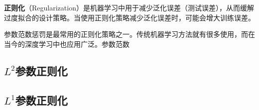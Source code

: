 
\textbf{正则化}（Regularization）是机器学习中用于减少泛化误差（测试误差），从而缓解过度拟合的设计策略。当使用正则化策略减少泛化误差时，可能会增大训练误差。

参数范数惩罚是最常用的正则化策略之一。传统机器学习方法就有很多使用，而在当今的深度学习中也应用广泛。参数范数

\subsection{$L^2$参数正则化}




\subsection{$L^1$参数正则化}